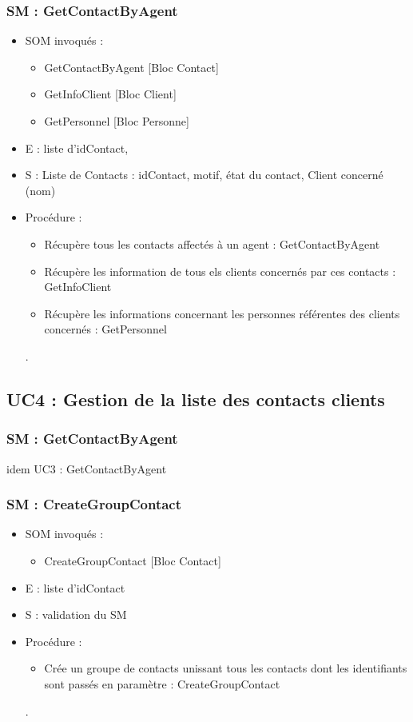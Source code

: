 \subsubsection{SM : GetContactByAgent}
\begin{itemize}
	\item SOM invoqués : 
		\begin{itemize}
			\item GetContactByAgent [Bloc Contact]
			\item GetInfoClient [Bloc Client]
			\item GetPersonnel [Bloc Personne]
		\end{itemize}
	\item E : liste d’idContact, 
	\item S : Liste de Contacts : idContact, motif, état du contact, Client concerné (nom)
	\item Procédure : 
		\begin{itemize}
			\item Récupère tous les contacts affectés à un agent : GetContactByAgent
			\item Récupère les information de tous els clients concernés par ces contacts : GetInfoClient
			\item Récupère les informations concernant les personnes référentes des clients concernés : GetPersonnel
		\end{itemize}.
\end{itemize}



\subsection{UC4 : Gestion de la liste des contacts clients}

\subsubsection{SM : GetContactByAgent}
idem UC3 : GetContactByAgent

\subsubsection{SM : CreateGroupContact}
\begin{itemize}
	\item SOM invoqués : 
		\begin{itemize}
			\item CreateGroupContact [Bloc Contact]
		\end{itemize}
	\item E : liste d’idContact
	\item S : validation du SM
	\item Procédure : 
		\begin{itemize}
			\item Crée un groupe de contacts unissant tous les contacts dont les identifiants sont passés en paramètre : CreateGroupContact
		\end{itemize}.
\end{itemize}

